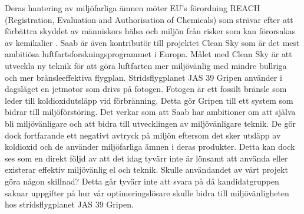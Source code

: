 \newline
\newline 
Deras hantering av miljöfarliga ämnen möter EU's förordning REACH (Registration, Evaluation and Authorisation of Chemicals) som strävar efter att förbättra skyddet av människors hälsa och miljön från risker som kan förorsakas av kemikalier \citep{reach}. 
Saab är även kontributör till projektet Clean Sky som är det mest ambitiösa luftfartsforskningsprogrammet i Europa. Målet med Clean Sky är att utveckla ny teknik för att göra luftfarten mer miljövänlig med mindre bullriga och mer bränsleeffektiva flygplan. \citep{cleansky}     
\newline
\newline
Stridsflygplanet JAS 39 Gripen använder i dagsläget en jetmotor som drivs på fotogen. Fotogen är ett fossilt bränsle som leder till koldioxidutsläpp vid förbränning. Detta gör Gripen till ett system som bidrar till miljöförstöring. 
\newline
\newline
Det verkar som att Saab har ambitioner om att själva bli miljövänligare och att bidra till utvecklingen av miljövänligare teknik. De gör dock fortfarande ett negativt avtryck på miljön eftersom det sker utsläpp av koldioxid och de använder miljöfarliga ämnen i deras produkter. Detta kan dock ses som en direkt följd av att det idag tyvärr inte är lönsamt att använda eller existerar effektiv miljövänlig el och teknik.  
\newline
\newline
Skulle användandet av vårt projekt göra någon skillnad? Detta går tyvärr inte att svara på då kandidatgruppen saknar uppgifter på hur vår optimeringslösare skulle bidra till miljövänligheten hos stridsflygplanet JAS 39 Gripen.        
